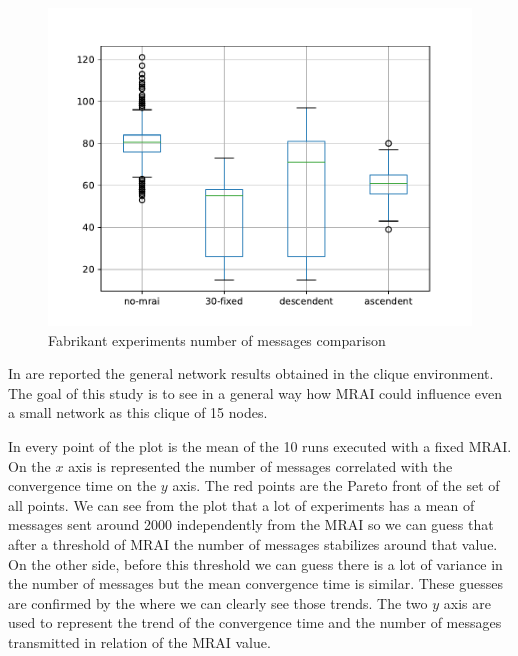 \documentclass[10pt,conference,letterpaper]{IEEEtran}
\newcommand{\figwidth}{0.78}
\newcommand{\figvspace}{-1.5em}
\begin{document}
\begin{figure}[tb]
	\centering
	\includegraphics[width=\figwidth\columnwidth]{images/fabrikant/messages_comparison}
	\caption{Fabrikant experiments number of messages comparison}
	\label{fig:fabr_msg_comp}
	\vspace{\figvspace}
\end{figure}

In  are reported the general
network results obtained in the clique environment.
The goal of this study is to see in a general way how \ac{MRAI} could influence
even a small network as this clique of \num{15} nodes.

In  every point of the plot is the mean of the \num{10}
runs executed with a fixed \ac{MRAI}.
On the $x$ axis is represented the number of messages correlated with the convergence
time on the $y$ axis.
The red points are the Pareto front of the set of all points.
We can see from the plot that a lot of experiments has a mean of messages sent 
around \num{2000} independently from the \ac{MRAI} so we can guess that after
a threshold of \ac{MRAI} the number of messages stabilizes around that value.
On the other side, before this threshold we can guess there is a lot of variance
in the number of messages but the mean convergence time is similar.
These guesses are confirmed by the  where we can clearly
see those trends.
The two $y$ axis are used to represent the trend of the convergence time and
the number of messages transmitted in relation of the \ac{MRAI} value.
\end{document}
